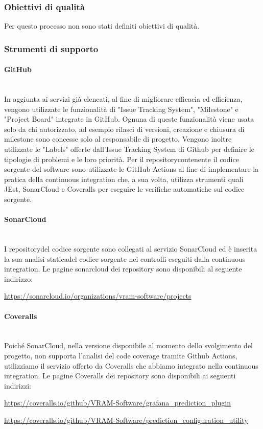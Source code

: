 	\subsubsection{Obiettivi di qualità}
	Per questo processo non sono stati definiti obiettivi di qualità.
	\subsubsection{Strumenti di supporto}
		\paragraph{GitHub} \mbox{}\\ [1mm]
			In aggiunta ai servizi già elencati, al fine di migliorare efficacia ed efficienza, vengono utilizzate le funzionalità di "Issue Tracking System",  
			"Milestone" e "Project Board" integrate in GitHub. Ognuna di queste funzionalità viene usata solo da chi autorizzato, ad esempio rilasci di versioni, creazione e chiusura di milestone sono concesse solo al responsabile di progetto\glo.
			\newline
			Vengono inoltre utilizzate le "Labels" offerte dall'Issue Tracking System di Github per definire le tipologie di problemi e le loro priorità.
			\newline
			Per il repository\glosp contenente il codice sorgente del software sono utilizzate le GitHub Actions al fine di implementare la pratica della continuous integration che, a sua volta, utilizza strumenti quali JEst, SonarCloud e Coveralls per eseguire le verifiche automatiche sul codice sorgente.
		\paragraph{SonarCloud} \mbox{}\\ [1mm]
		I repository\glosp del codice sorgente sono collegati al servizio SonarCloud ed è inserita la sua analisi statica\glosp del codice sorgente nei controlli eseguiti dalla continuous integration. Le pagine sonarcloud dei repository sono disponibili al seguente indirizzo: 
		\begin{center}
			\url{https://sonarcloud.io/organizations/vram-software/projects}
		\end{center}
		\paragraph{Coveralls} \mbox{}\\ [1mm]
		Poiché SonarCloud, nella versione disponibile al momento dello svolgimento del progetto\glo, non supporta l'analisi del code coverage tramite Github Actions, utilizziamo il servizio offerto da Coveralls che abbiamo integrato nella continuous integration. Le pagine Coveralls dei repository sono disponibili ai seguenti indirizzi:
		\begin{center}
			\url{https://coveralls.io/github/VRAM-Software/grafana_prediction_plugin}
		\end{center}
		\begin{center}
		\url{https://coveralls.io/github/VRAM-Software/prediction_configuration_utility}
		\end{center}
	
		